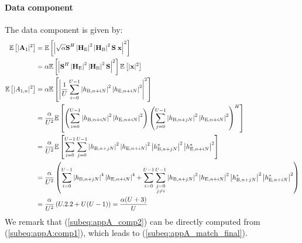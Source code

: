 \paragraph*{Data component}
The data component is given by:
\begin{subequations}
    \begin{align}
        \mathbb{E} \left[|\textbf{A}_{1}|^2\right] &= \mathbb{E} \left[\left|\sqrt{\alpha} \textbf{S}^H \left|\textbf{H}_{\text{E}}\right|^2 \left|\textbf{H}_{\text{B}}\right|^2 \textbf{S}\; \textbf{x}\right|^2\right] \\
        &= \alpha \mathbb{E} \left[\left| \textbf{S}^H \left|\textbf{H}_{\text{E}}\right|^2 \left|\textbf{H}_{\text{B}}\right|^2 \textbf{S}\right|^2\right] \mathbb{E} \left[|\textbf{x}|^2\right] \\
        \mathbb{E} \left[|A_{1,n}|^2\right] &= \alpha \mathbb{E} \left[\left|\frac{1}{U}\sum_{i=0}^{U-1} \left| h_{\text{B}, n + iN}\right|^2 \left| h_{\text{E}, n + iN}\right|^2\right|^2\right] \\
        &=  \frac{\alpha}{U^2} \mathbb{E} \left[\left(\sum_{i=0}^{U-1} \left| h_{\text{B}, n + iN}\right|^2 \left| h_{\text{E}, n + iN}\right|^2 \right) \left(\sum_{j=0}^{U-1} \left| h_{\text{B}, n + jN}\right|^2 \left| h_{\text{E}, n + iN}\right|^2 \right)^H\right] \label{subeq:appA_comp2} \\
        &= \frac{\alpha}{U^2} \mathbb{E} \left[\sum_{i=0}^{U-1}\sum_{j=0}^{U-1} \left| h_{\text{B}, n + jN}\right|^2 \left| h_{\text{E}, n + iN}\right|^2 \left| h^*_{\text{B}, n + jN}\right|^2 \left| h^*_{\text{E}, n + iN}\right|^2\right] \\
        &= \frac{\alpha}{U^2}\left( \sum_{i=0}^{U-1} \left| h_{\text{B}, n + jN}\right|^4 \left| h_{\text{E}, n + iN}\right|^4 + \sum_{i=0}^{U-1}\sum_{\substack{j=0 \\ j\neq i}}^{U-1}  \left| h_{\text{B}, n + jN}\right|^2 \left| h_{\text{E}, n + iN}\right|^2 \left| h^*_{\text{B}, n + jN}\right|^2 \left| h^*_{\text{E}, n + iN}\right|^2 \right) \\
        &= \frac{\alpha}{U^2} \left(U.2.2 + U(U-1) \right) = \frac{\alpha (U+3)}{U}
        \label{subeq:appA_match_final}
     \end{align} 
    \label{eq:appA:data_eve_filt1}
\end{subequations}
We remark that (\ref{subeq:appA_comp2}) can be directly computed from (\ref{subeq:appA:comp1}), which leads to (\ref{subeq:appA_match_final}).\\



